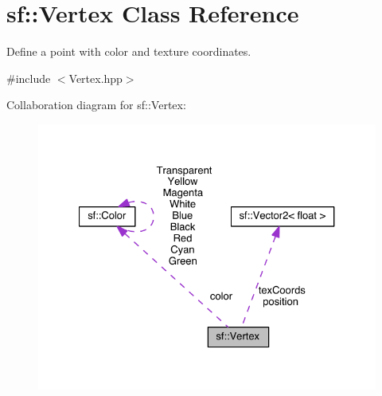 \hypertarget{classsf_1_1_vertex}{\section{sf\-:\-:Vertex Class Reference}
\label{classsf_1_1_vertex}
}


Define a point with color and texture coordinates.  




{\ttfamily \#include $<$Vertex.\-hpp$>$}



Collaboration diagram for sf\-:\-:Vertex\-:
\nopagebreak
\begin{figure}[H]
\begin{center}
\leavevmode
\includegraphics[width=327pt]{classsf_1_1_vertex__coll__graph}
\end{center}
\end{figure}
